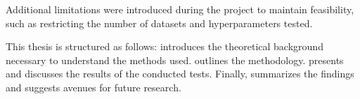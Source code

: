 Additional limitations were introduced during the project to maintain feasibility, such as restricting the number of datasets and hyperparameters tested.

This thesis is structured as follows:  introduces the theoretical background necessary to understand the methods used.  outlines the methodology.  presents and discusses the results of the conducted tests. Finally,  summarizes the findings and suggests avenues for future research.






